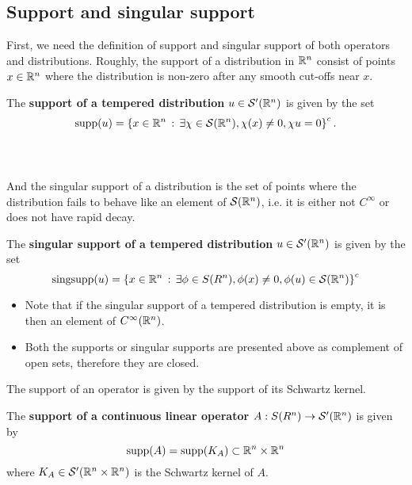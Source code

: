\documentclass[12pt]{article}
\begin{document}
\subsection{Support and singular support} 
First, we need the definition of support and singular support of both operators and distributions. Roughly, the support of a distribution in ${\mathbb R}^n$ consist of points $x \in {\ensuremath {\mathbb R}}^n$ where the distribution is non-zero after any smooth cut-offs near $x$. 
\begin{fdefinition}
    The \textbf{support of a tempered distribution} $u \in \mathcal{S}'({\mathbb R}^n)$ is given by the set
    \[
    \mathrm{supp}(u) = \left\{x \in {\ensuremath {\mathbb R}}^n \, : \, \exists \chi \in \mathcal{S}({\mathbb R}^n), \chi(x) \neq 0, \chi u = 0\right\}^c. 
    \]
    \\
    
\end{fdefinition}
\hfill \\
And the singular support of a distribution is the set of points where the distribution fails to behave like an element of $\mathcal{S}({\mathbb R}^n)$, i.e. it is either not $C^\infty$ or does not have rapid decay. 
\begin{fdefinition}
    The \textbf{singular support of a tempered distribution} $ u \in \mathcal{S}'({\mathbb R}^n)$ is given by the set 
    \[
    \mathrm{sing supp}(u) = \left\{x \in {\ensuremath {\mathbb R}}^n \, : \, \exists \phi \in S(R^n), \phi(x) \neq 0, \phi(u) \in \mathcal{S}({\mathbb R}^n)\right\}^c
    \]
\end{fdefinition}
\begin{rem} \hfill 
    \begin{itemize}
        \item     Note that if the singular support of a tempered distribution is empty, it is then an element of $C^\infty({\mathbb R}^n)$.     
        \item  Both the supports or singular supports are presented above as complement of open sets, therefore they are closed. \\
        
    \end{itemize}

\end{rem}

The support of an operator is given by the support of its Schwartz kernel. 

\begin{fdefinition}
    The \textbf{support of a continuous linear operator} $A: S(R^n) \to \mathcal{S}'({\mathbb R}^n)$ is given by 
    \[
    \mathrm{supp}(A) = \mathrm{supp}(K_A) \subset {\ensuremath {\mathbb R}}^n \times {\ensuremath {\mathbb R}}^n
    \]
    where $K_A \in \mathcal{S}'({\mathbb R}^n \times {\ensuremath {\mathbb R}}^n)$ is the Schwartz kernel of $A$. 
\end{fdefinition}
\end{document}
